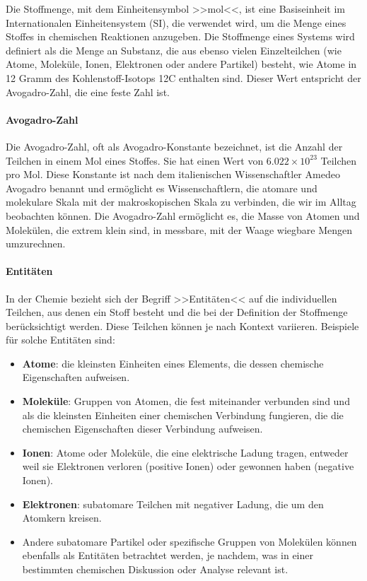 \documentclass{vorlage-design-main}
\begin{document}
Die Stoffmenge, mit dem Einheitensymbol >>mol<<, ist eine Basiseinheit
im Internationalen Einheitensystem (SI), die verwendet wird, um die
Menge eines Stoffes in chemischen Reaktionen anzugeben. Die Stoffmenge
eines Systems wird definiert als die Menge an Substanz, die aus ebenso
vielen Einzelteilchen (wie Atome, Moleküle, Ionen, Elektronen oder
andere Partikel) besteht, wie Atome in 12 Gramm des Kohlenstoff-Isotops
12C enthalten sind. Dieser Wert entspricht der Avogadro-Zahl, die eine
feste Zahl ist.

\hypertarget{avogadro-zahl}{%
\paragraph{Avogadro-Zahl}\label{avogadro-zahl}}

Die Avogadro-Zahl, oft als Avogadro-Konstante bezeichnet, ist die Anzahl
der Teilchen in einem Mol eines Stoffes. Sie hat einen Wert von
$6.022 \times 10^{23}$ Teilchen pro Mol. Diese Konstante ist nach dem
italienischen Wissenschaftler Amedeo Avogadro benannt und ermöglicht es
Wissenschaftlern, die atomare und molekulare Skala mit der
makroskopischen Skala zu verbinden, die wir im Alltag beobachten können.
Die Avogadro-Zahl ermöglicht es, die Masse von Atomen und Molekülen, die
extrem klein sind, in messbare, mit der Waage wiegbare Mengen
umzurechnen.

\hypertarget{entituxe4ten}{%
\paragraph{Entitäten}\label{entitaeten}}

In der Chemie bezieht sich der Begriff >>Entitäten<< auf die
individuellen Teilchen, aus denen ein Stoff besteht und die bei der
Definition der Stoffmenge berücksichtigt werden. Diese Teilchen können
je nach Kontext variieren. Beispiele für solche Entitäten sind:

\begin{itemize}

\item
  \textbf{Atome}: die kleinsten Einheiten eines Elements, die dessen
  chemische Eigenschaften aufweisen.
\item
  \textbf{Moleküle}: Gruppen von Atomen, die fest miteinander verbunden
  sind und als die kleinsten Einheiten einer chemischen Verbindung
  fungieren, die die chemischen Eigenschaften dieser Verbindung
  aufweisen.
\item
  \textbf{Ionen}: Atome oder Moleküle, die eine elektrische Ladung
  tragen, entweder weil sie Elektronen verloren (positive Ionen) oder
  gewonnen haben (negative Ionen).
\item
  \textbf{Elektronen}: subatomare Teilchen mit negativer Ladung, die um
  den Atomkern kreisen.
\item
  Andere subatomare Partikel oder spezifische Gruppen von Molekülen
  können ebenfalls als Entitäten betrachtet werden, je nachdem, was in
  einer bestimmten chemischen Diskussion oder Analyse relevant ist.
\end{itemize}
\end{document}
